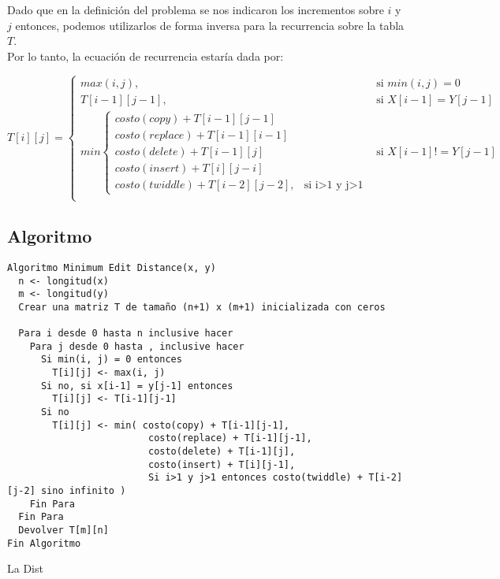 Dado que en la definición del problema se nos indicaron los incrementos sobre \(i\) y \(j\) entonces, podemos utilizarlos de forma inversa para la recurrencia sobre la tabla \(T\).\\

Por lo tanto, la ecuación de recurrencia estaría dada por:

\[
T[i][j] = 
\begin{cases}
max(i,j), & \text{si } min(i,j) = 0 \\
T[i-1][j-1], & \text{si } X[i-1] = Y[j-1]\\
min\begin{cases}
costo(copy) + T[i-1][j-1]\\
costo(replace) + T[i-1][i-1]\\
costo(delete) + T[i-1][j]\\
costo(insert) + T[i][j-i]\\
costo(twiddle) + T[i-2][j-2], & \text{si i>1 y j>1} 
\end{cases}& \text{si } X[i-1] != Y[j-1]\\
\end{cases}
\]


\subsection*{Algoritmo}

\begin{verbatim}
Algoritmo Minimum Edit Distance(x, y)
  n <- longitud(x)
  m <- longitud(y)
  Crear una matriz T de tamaño (n+1) x (m+1) inicializada con ceros
  
  Para i desde 0 hasta n inclusive hacer
    Para j desde 0 hasta , inclusive hacer
      Si min(i, j) = 0 entonces
        T[i][j] <- max(i, j)
      Si no, si x[i-1] = y[j-1] entonces
        T[i][j] <- T[i-1][j-1]
      Si no
        T[i][j] <- min( costo(copy) + T[i-1][j-1],
                         costo(replace) + T[i-1][j-1],
                         costo(delete) + T[i-1][j],
                         costo(insert) + T[i][j-1],
                         Si i>1 y j>1 entonces costo(twiddle) + T[i-2][j-2] sino infinito )
    Fin Para
  Fin Para
  Devolver T[m][n]
Fin Algoritmo
\end{verbatim}


La Dist